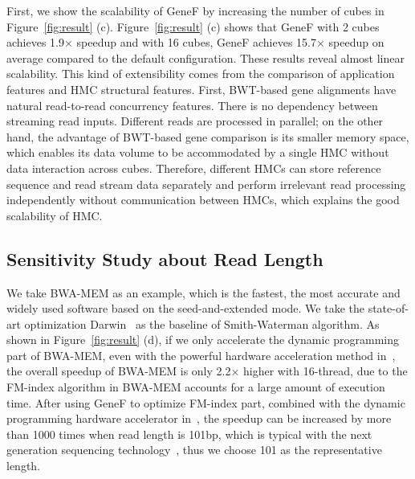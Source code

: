 \documentclass[9pt,conference]{IEEEtran}
\begin{document}
First, we show the scalability of GeneF by increasing the number of cubes in Figure~\ref{fig:result} (c). Figure~\ref{fig:result} (c) shows that GeneF with 2 cubes achieves 1.9$\times$ speedup and with 16 cubes, GeneF achieves 15.7$\times$ speedup on average compared to the default configuration. These results reveal almost linear scalability. This kind of extensibility comes from the comparison of application features and HMC structural features. First, BWT-based gene alignments have natural read-to-read concurrency features. There is no dependency between streaming read inputs. Different reads are processed in parallel; on the other hand, the advantage of BWT-based gene comparison is its smaller memory space, which enables its data volume to be accommodated by a single HMC without data interaction across cubes. Therefore, different HMCs can store reference sequence and read stream data separately and perform irrelevant read processing independently without communication between HMCs, which explains the good scalability of HMC.


\subsection{Sensitivity Study about Read Length}

We take BWA-MEM as an example, which is the fastest, the most accurate and widely used software based on the seed-and-extended mode. We take the state-of-art optimization Darwin~\cite{turakhia2018darwin} as the baseline of Smith-Waterman algorithm. As shown in Figure~\ref{fig:result} (d), if we only accelerate the dynamic programming part of BWA-MEM, even with the powerful hardware acceleration method in~\cite{turakhia2018darwin}, the overall speedup of BWA-MEM is only 2.2$\times$ higher with 16-thread, due to the FM-index algorithm in BWA-MEM accounts for a large amount of execution time. After using GeneF to optimize FM-index part, combined with the dynamic programming hardware accelerator in~\cite{turakhia2018darwin}, the speedup can be increased by more than 1000 times when read length is 101bp, which is typical with the next generation sequencing technology~\cite{depristo2011framework, fujiki2018genax}, thus we choose 101 as the representative length. 
\end{document}
